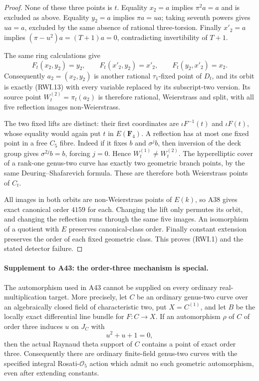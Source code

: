 \documentclass[11pt,a4paper]{article}
\begin{document}
\begin{proof}
None of these three points is $t$. Equality $x_2=a$
implies $\pi^2a=a$ and is excluded as above.
Equality $y_2=a$ implies $\pi a=ua$; taking seventh
powers gives $ua=a$, excluded by the same absence
of rational three-torsion. Finally $x'_2=a$
implies $(\pi-u^2)a=(T+1)a=0$, contradicting
invertibility of $T+1$.

The same ring calculations give
\[
 F_t(x_2,y_2)=y_2,\qquad
 F_t(x'_2,y_2)=x'_2,\qquad
 F_t(y_2,x'_2)=x_2.
 \tag{RWI.15}
\]
Consequently $a_2=(x_2,y_2)$ is another rational
$\tau_1$-fixed point of $D_t$, and its orbit is
exactly (RWI.13) with every variable replaced by
its subscript-two version. Its source point
$W_t^{(2)}=\pi_t(a_2)$ is therefore rational,
Weierstrass and split, with all five reflection
images non-Weierstrass.

The two fixed lifts are distinct: their first
coordinates are $\iota F^{-1}(t)$ and $\iota F(t)$,
whose equality would again put $t$ in $E(\mathbf F_4)$.
A reflection has at most one fixed point in a free
$C_5$ fibre. Indeed if it fixes $b$ and $\sigma^j b$,
then inversion of the deck group gives
$\sigma^{2j}b=b$, forcing $j=0$. Hence
$W_t^{(1)}\ne W_t^{(2)}$.
The hyperelliptic cover of a rank-one genus-two curve
has exactly two geometric branch points, by the same
Deuring--Shafarevich formula. These are therefore both
Weierstrass points of $C_t$.

All images in both orbits are non-Weierstrass points
of $E(k)$, so A38 gives exact canonical order $4159$
for each. Changing the lift only permutes its orbit,
and changing the reflection runs through the same
five images. An isomorphism of a quotient with $E$
preserves canonical-class order. Finally constant
extension preserves the order of each fixed geometric
class. This proves (RWI.1) and the stated detector failure.
\end{proof}


\paragraph{Supplement to A43: the order-three mechanism is special.}
The automorphism used in A43 cannot be supplied on every ordinary
real-multiplication target.  More precisely, let $C$ be an ordinary
genus-two curve over an algebraically closed field of characteristic
two, put $X=C^{(1)}$, and let $B$ be the locally exact differential
line bundle for $F:C\to X$.  If an automorphism $\rho$ of $C$ of
order three induces $u$ on $J_C$ with
\[
                         u^2+u+1=0,
\]
then the actual Raynaud theta support of $C$ contains a point of
exact order three.  Consequently there are ordinary finite-field
genus-two curves with the specified integral Rosati-$\mathcal O_5$
action which admit no such geometric automorphism, even after
extending constants.
\end{document}
